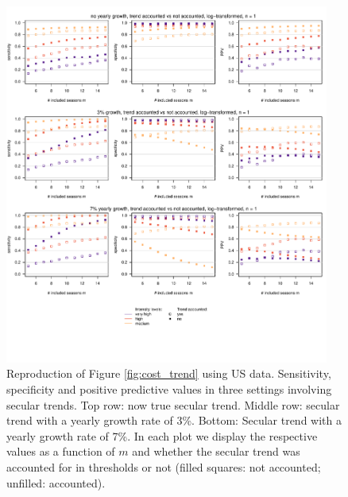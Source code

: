 \documentclass[12pt]{article}
\begin{document}
\begin{figure}[h!]
\begin{center}
\includegraphics[width = 0.95\textwidth]{figure/plot_cost_trend_us.pdf}
\end{center}
\caption{Reproduction of Figure \ref{fig:cost_trend} using US data. Sensitivity, specificity and positive predictive values in three settings involving secular trends. Top row: now true secular trend. Middle row: secular trend with a yearly growth rate of 3\%. Bottom: Secular trend with a yearly growth rate of 7\%. In each plot we display the respective values as a function of $m$ and whether the secular trend was accounted for in thresholds or not (filled squares: not accounted; unfilled: accounted).}
\end{figure}

\end{document}

